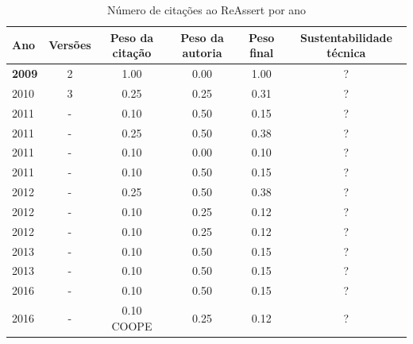 \begin{table}[H]
\caption{Número de citações ao ReAssert por ano}
\centering
\begin{tabular}{| l | c | c | c | c | c |}
  \hline
  Ano & Versões & Peso da citação & Peso da autoria & Peso final & Sustentabilidade técnica \\
  \hline
            {\bf 2009}
          &
          2
          &
          1.00
          &
          0.00
          &
            {\color{blue} 1.00}
          &
          ?
          \\
\hline
            2010
          &
          3
          &
          0.25
          &
          0.25
          &
            {\color{red} 0.31}
          &
          ?
          \\
\hline
            2011
          &
          -
          &
          0.10
          &
          0.50
          &
            {\color{red} 0.15}
          &
          ?
          \\
            2011
          &
          -
          &
          0.25
          &
          0.50
          &
            {\color{red} 0.38}
          &
          ?
          \\
            2011
          &
          -
          &
          0.10
          &
          0.00
          &
            {\color{red} 0.10}
          &
          ?
          \\
            2011
          &
          -
          &
          0.10
          &
          0.50
          &
            {\color{red} 0.15}
          &
          ?
          \\
\hline
            2012
          &
          -
          &
          0.25
          &
          0.50
          &
            {\color{red} 0.38}
          &
          ?
          \\
            2012
          &
          -
          &
          0.10
          &
          0.25
          &
            {\color{red} 0.12}
          &
          ?
          \\
            2012
          &
          -
          &
          0.10
          &
          0.25
          &
            {\color{red} 0.12}
          &
          ?
          \\
\hline
            2013
          &
          -
          &
          0.10
          &
          0.50
          &
            {\color{red} 0.15}
          &
          ?
          \\
            2013
          &
          -
          &
          0.10
          &
          0.50
          &
            {\color{red} 0.15}
          &
          ?
          \\
\hline
            2016
          &
          -
          &
          0.10
          &
          0.50
          &
            {\color{red} 0.15}
          &
          ?
          \\
            2016
          &
          -
          &
          0.10
            {\tiny COOPE}
          &
          0.25
          &
            {\color{red} 0.12}
          &
          ?
          \\
\hline
\end{tabular}
\end{table}
